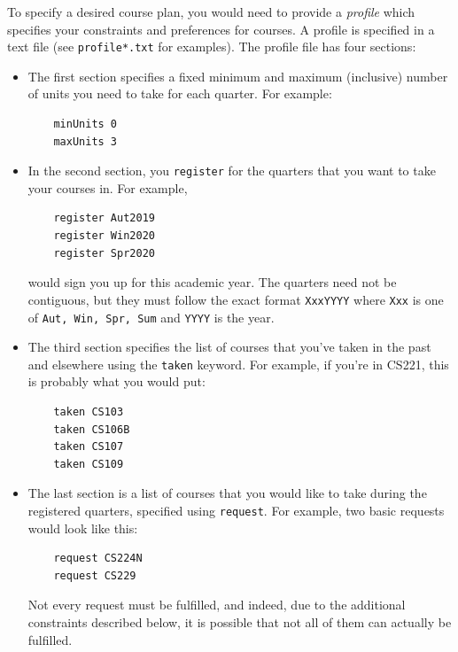 \documentclass{article}
\theoremstyle{case}
\theoremstyle{definition}
\begin{document}
To specify a desired course plan, you would need to provide a \emph{profile} which specifies your constraints and preferences for courses. A profile is specified in a text file (see \texttt{profile*.txt} for examples). The profile file has four sections:
\begin{itemize}
    \item The first section specifies a fixed minimum and maximum (inclusive) number of units you need to take for each quarter. For example:
    \begin{verbatim}
    minUnits 0
    maxUnits 3
    \end{verbatim}
    \item In the second section, you \texttt{register} for the quarters that you want to take your courses in. For example,
    \begin{verbatim}
    register Aut2019
    register Win2020
    register Spr2020
    \end{verbatim}
    would sign you up for this academic year. The quarters need not be contiguous, but they must follow the exact format \texttt{XxxYYYY} where \texttt{Xxx} is one of \texttt{Aut, Win, Spr, Sum} and \texttt{YYYY} is the year.
    \item The third section specifies the list of courses that you've taken in the past and elsewhere using the \texttt{taken} keyword. For example, if you're in CS221, this is probably what you would put:
    \begin{verbatim}
    taken CS103
    taken CS106B
    taken CS107
    taken CS109
    \end{verbatim}
    \item The last section is a list of courses that you would like to take during the registered quarters, specified using \texttt{request}. For example, two basic requests would look like this:
    \begin{verbatim}
    request CS224N
    request CS229
    \end{verbatim}
    Not every request must be fulfilled, and indeed, due to the additional constraints described below, it is possible that not all of them can actually be fulfilled.
\end{itemize}
\end{document}
